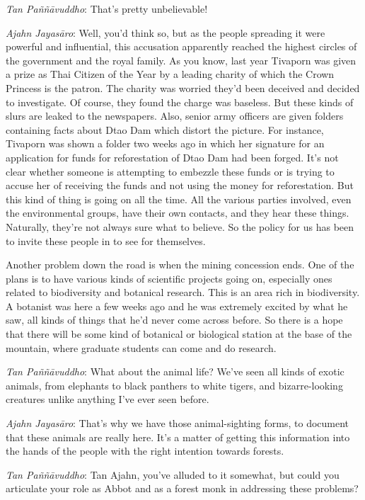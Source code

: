 \emph{Tan Paññāvuddho}: That's pretty unbelievable! 

\emph{Ajahn Jayasāro}: Well, you'd think so, but as the people
spreading it were powerful and influential, this accusation apparently
reached the highest circles of the government and the royal family. As
you know, last year Tivaporn was given a prize as Thai Citizen of the
Year by a leading charity of which the Crown Princess is the patron. The
charity was worried they'd been deceived and decided to investigate. Of
course, they found the charge was baseless. But these kinds of slurs are
leaked to the newspapers. Also, senior army officers are given folders
containing facts about Dtao Dam which distort the picture. For instance, 
Tivaporn was shown a folder two weeks ago in which her signature for an
application for funds for reforestation of Dtao Dam had been forged. 
It's not clear whether someone is attempting to embezzle these funds or
is trying to accuse her of receiving the funds and not using the money
for reforestation. But this kind of thing is going on all the time. All
the various parties involved, even the environmental groups, have their
own contacts, and they hear these things. Naturally, they're not always
sure what to believe. So the policy for us has been to invite these
people in to see for themselves. 

Another problem down the road is when the mining concession ends. One of
the plans is to have various kinds of scientific projects going on, 
especially ones related to biodiversity and botanical research. This is
an area rich in biodiversity. A botanist was here a few weeks ago and he
was extremely excited by what he saw, all kinds of things that he'd
never come across before. So there is a hope that there will be some
kind of botanical or biological station at the base of the mountain, 
where graduate students can come and do research. 

\emph{Tan Paññāvuddho}: What about the animal life? We've seen all
kinds of exotic animals, from elephants to black panthers to white
tigers, and bizarre-looking creatures unlike anything I've ever seen
before. 

\emph{Ajahn Jayasāro}: That's why we have those animal-sighting forms, 
to document that these animals are really here. It's a matter of getting
this information into the hands of the people with the right intention
towards forests. 

\emph{Tan Paññāvuddho}: Tan Ajahn, you've alluded to it somewhat, but
could you articulate your role as Abbot and as a forest monk in
addressing these problems? 

